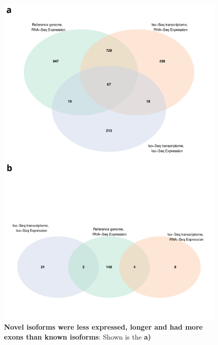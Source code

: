 \begin{figure}[!htp]
	\begin{center}
		\includegraphics[page=11,scale = 0.55]{Figures/WholeDifferentialAnalysis.pdf}
	\end{center}
	\captionsetup{width=0.95\textwidth}
	\caption[Comparison of Known and Novel Isoforms from Iso-Seq Whole Transcriptome runs]%
	{\textbf{Novel isoforms were less expressed, longer and had more exons than known isoforms}: Shown is the \textbf{a)}}   
	\label{fig:whole_novelgene_diffexp}
\end{figure}
   

